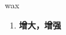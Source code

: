 
\begin{frame}
{\huge wax}
\begin{center}
\begin{enumerate}\Large
  \item \textbf{增大，增强}
\end{enumerate}
\end{center}
\end{frame}
